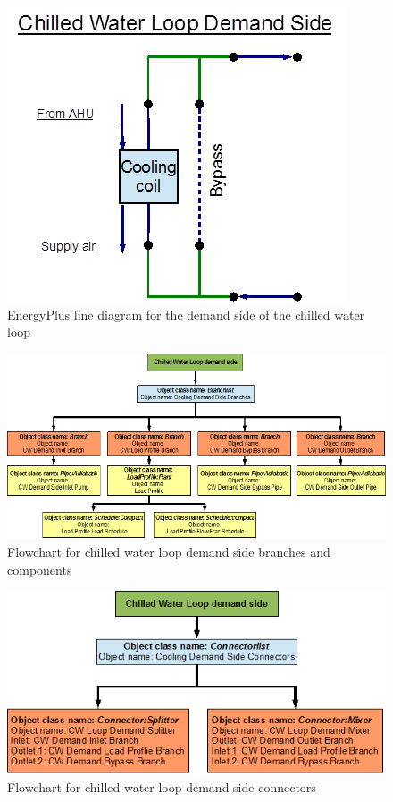 \begin{figure}[htbp] %
\centering
\includegraphics{media/image021.png}
\caption{EnergyPlus line diagram for the demand side of the chilled water loop \protect \label{fig:energyplus-line-diagram-for-the-demand-side}}
\end{figure}

\begin{figure}[htbp] %
\centering
\includegraphics{media/image022.png}
\caption{Flowchart for chilled water loop demand side branches and components \protect \label{fig:flowchart-for-chilled-water-loop-demand-side-and}}
\end{figure}

\begin{figure}[htbp] %
\centering
\includegraphics{media/image023.png}
\caption{Flowchart for chilled water loop demand side connectors \protect \label{fig:flowchart-for-chilled-water-loop-demand-side-connectors}}
\end{figure}

